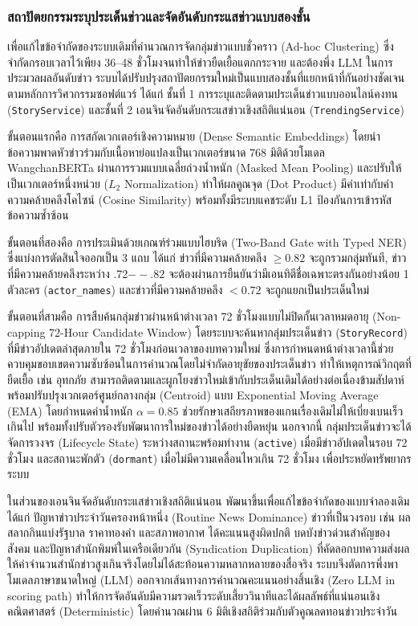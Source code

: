 \subsubsection{สถาปัตยกรรมระบุประเด็นข่าวและจัดอันดับกระแสข่าวแบบสองชั้น}
เพื่อแก้ไขข้อจำกัดของระบบเดิมที่คำนวณการจัดกลุ่มข่าวแบบชั่วคราว (Ad-hoc Clustering) ซึ่งจำกัดกรอบเวลาไว้เพียง 36--48 ชั่วโมงจนทำให้ข่าวยืดเยื้อแตกกระจาย และต้องพึ่ง LLM ในการประมวลผลอันดับข่าว ระบบได้ปรับปรุงสถาปัตยกรรมใหม่เป็นแบบสองชั้นที่แยกหน้าที่กันอย่างชัดเจนตามหลักการวิศวกรรมซอฟต์แวร์ ได้แก่ ชั้นที่ 1 การระบุและติดตามประเด็นข่าวแบบออนไลน์คงทน (\texttt{StoryService}) และชั้นที่ 2 เอนจินจัดอันดับกระแสข่าวเชิงสถิติแน่นอน (\texttt{TrendingService})

ขั้นตอนแรกคือ การสกัดเวกเตอร์เชิงความหมาย (Dense Semantic Embeddings) โดยนำข้อความพาดหัวข่าวร่วมกับเนื้อหาย่อแปลงเป็นเวกเตอร์ขนาด 768 มิติด้วยโมเดล WangchanBERTa ผ่านการรวมแบบเฉลี่ยถ่วงน้ำหนัก (Masked Mean Pooling) และปรับให้เป็นเวกเตอร์หนึ่งหน่วย ($L_2$ Normalization) ทำให้ผลคูณจุด (Dot Product) มีค่าเท่ากับค่าความคล้ายคลึงโคไซน์ (Cosine Similarity) พร้อมทั้งมีระบบแคชระดับ L1 ป้องกันการเข้ารหัสข้อความซ้ำซ้อน

ขั้นตอนที่สองคือ การประเมินด้วยเกณฑ์ร่วมแบบไฮบริด (Two-Band Gate with Typed NER) ซึ่งแบ่งการตัดสินใจออกเป็น 3 แถบ ได้แก่ ข่าวที่มีความคล้ายคลึง $\ge 0.82$ จะถูกรวมกลุ่มทันที, ข่าวที่มีความคล้ายคลึงระหว่าง .72$--.82$ จะต้องผ่านการยืนยันว่ามีเอนทิตีชื่อเฉพาะตรงกันอย่างน้อย 1 ตัวละคร (\texttt{actor\_names}) และข่าวที่มีความคล้ายคลึง $< 0.72$ จะถูกแยกเป็นประเด็นใหม่

ขั้นตอนที่สามคือ การสืบค้นกลุ่มข่าวผ่านหน้าต่างเวลา 72 ชั่วโมงแบบไม่ปิดกั้นเวลาหมดอายุ (Non-capping 72-Hour Candidate Window) โดยระบบจะค้นหากลุ่มประเด็นข่าว (\texttt{StoryRecord}) ที่มีข่าวอัปเดตล่าสุดภายใน 72 ชั่วโมงก่อนเวลาของบทความใหม่ ซึ่งการกำหนดหน้าต่างเวลานี้ช่วยควบคุมขอบเขตความซับซ้อนในการคำนวณโดยไม่จำกัดอายุขัยของประเด็นข่าว ทำให้เหตุการณ์วิกฤตที่ยืดเยื้อ เช่น อุทกภัย สามารถติดตามและผูกโยงข่าวใหม่เข้ากับประเด็นเดิมได้อย่างต่อเนื่องข้ามสัปดาห์ พร้อมปรับปรุงเวกเตอร์ศูนย์กลางกลุ่ม (Centroid) แบบ Exponential Moving Average (EMA) โดยกำหนดค่าน้ำหนัก $\alpha = 0.85$ ช่วยรักษาเสถียรภาพของแกนเรื่องเดิมไม่ให้เบี่ยงเบนเร็วเกินไป พร้อมทั้งปรับตัวรองรับพัฒนาการใหม่ของข่าวได้อย่างยืดหยุ่น นอกจากนี้ กลุ่มประเด็นข่าวจะได้จัดการวงจร (Lifecycle State) ระหว่างสถานะพร้อมทำงาน (\texttt{active}) เมื่อมีข่าวอัปเดตในรอบ 72 ชั่วโมง และสถานะพักตัว (\texttt{dormant}) เมื่อไม่มีความเคลื่อนไหวเกิน 72 ชั่วโมง เพื่อประหยัดทรัพยากรระบบ

ในส่วนของเอนจินจัดอันดับกระแสข่าวเชิงสถิติแน่นอน พัฒนาขึ้นเพื่อแก้ไขข้อจำกัดของแบบจำลองเดิม ได้แก่ ปัญหาข่าวประจำวันครองหน้าหนึ่ง (Routine News Dominance) ข่าวที่เป็นวงรอบ เช่น ผลสลากกินแบ่งรัฐบาล ราคาทองคำ และสภาพอากาศ ได้คะแนนสูงผิดปกติ บดบังข่าวด่วนสำคัญของสังคม และปัญหาสำนักพิมพ์ในเครือเดียวกัน (Syndication Duplication) ที่คัดลอกบทความส่งผลให้ค่าจำนวนสำนักข่าวสูงเกินจริงโดยไม่ได้สะท้อนความหลากหลายของสื่อจริง ระบบจึงตัดการพึ่งพาโมเดลภาษาขนาดใหญ่ (LLM) ออกจากเส้นทางการคำนวณคะแนนอย่างสิ้นเชิง (Zero LLM in scoring path) ทำให้การจัดอันดับมีความรวดเร็วระดับเสี้ยววินาทีและได้ผลลัพธ์ที่แน่นอนเชิงคณิตศาสตร์ (Deterministic) โดยคำนวณผ่าน 6 มิติเชิงสถิติร่วมกับตัวคูณลดทอนข่าวประจำวัน

